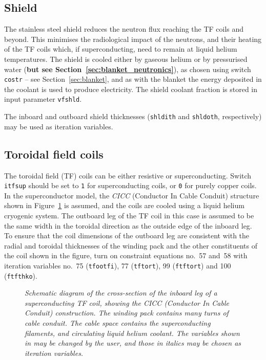 \documentclass[11pt,a4paper]{report}
\begin{document}
\subsection{Shield}

The stainless steel shield reduces the neutron flux reaching the TF coils and
beyond. This minimises the radiological impact of the neutrons, and their
heating of the TF coils which, if superconducting, need to remain at liquid
helium temperatures. The shield is cooled either by gaseous helium or by
pressurised water (\textbf{but see Section~\ref{sec:blanket_neutronics}}), as
chosen using switch \texttt{costr} -- see Section~\ref{sec:blanket}, and as
with the blanket the energy deposited in the coolant is used to produce
electricity. The shield coolant fraction is stored in input parameter
\texttt{vfshld}.

The inboard and outboard shield thicknesses (\texttt{shldith} and
\texttt{shldoth}, respectively) may be used as iteration variables.

\subsection{Toroidal field coils}
\label{sec:tfcoil}

The toroidal field (TF) coils can be either resistive or
superconducting. Switch \texttt{itfsup} should be set to \texttt{1} for
superconducting coils, or \texttt{0} for purely copper coils. In the
superconductor model, the \textit{CICC}\/ (Conductor In Cable Conduit)
structure shown in Figure~\ref{fig:CICC} is assumed, and the coils are cooled
using a liquid helium cryogenic system. The outboard leg of the TF coil in
this case is assumed to be the same width in the toroidal direction as the
outside edge of the inboard leg. To ensure that the coil dimensions of the
outboard leg are consistent with the radial and toroidal thicknesses of the
winding pack and the other constituents of the coil shown in the figure, turn
on constraint equations no.~57 and~58 with iteration variables no.\ 75
(\texttt{tfootfi}), 77 (\texttt{tftort}), 99 (\texttt{ftftort}) and 100
(\texttt{ftfthko}).

\begin{figure}[tbph]
\caption[Schematic diagram of the cross-section of a superconducting TF coil
inner leg]
{\label{fig:CICC}
  \textit{Schematic diagram of the cross-section of the inboard leg of a
    superconducting TF coil, showing the CICC (Conductor In Cable Conduit)
    construction. The winding pack contains many turns of cable conduit. The
    cable space contains the superconducting filaments, and circulating liquid
    helium coolant. The variables shown in  may be changed by the
    user, and those in italics may be chosen as iteration variables.}
}
\end{figure}
\end{document}
